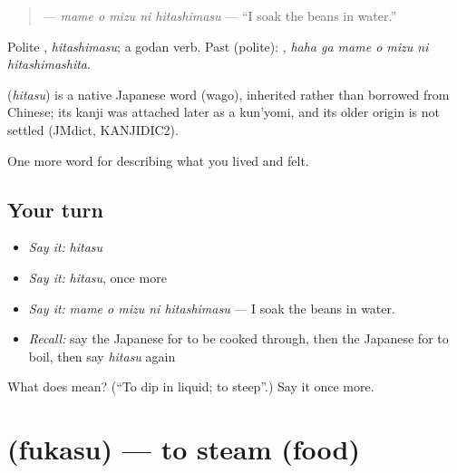 \begin{quote}
\textbf{  } — \emph{mame o mizu ni hitashimasu} — \textquotedblleft{}I soak the beans in water.\textquotedblright{}
\end{quote}

Polite \textbf{}, \emph{hitashimasu}; a godan verb. Past (polite): \textbf{   }, \emph{haha ga mame o mizu ni hitashimashita}.

\begin{cousinweb}
\textbf{} (\emph{hitasu}) is a native Japanese word (wago), inherited rather than borrowed from Chinese; its kanji was attached later as a kun'yomi, and its older origin is not settled (JMdict, KANJIDIC2).
\end{cousinweb}

\begin{grammarlens}[title={What you've built}]
One more word for describing what you lived and felt.
\end{grammarlens}

\subsection*{Your turn}
\begin{itemize}
\raggedright
  \item \emph{Say it:} \emph{hitasu}
  \item \emph{Say it:} \emph{hitasu}, once more
  \item \emph{Say it:} \emph{mame o mizu ni hitashimasu} — I soak the beans in water.
  \item \emph{Recall:} say the Japanese for to be cooked through, then the Japanese for to boil, then say \emph{hitasu} again
\end{itemize}

\begin{tcolorbox}[breakable,colback=teal!4,colframe=teal!35!black,title={Before you move on}]
What does  mean? (\textquotedblleft{}To dip in liquid; to steep\textquotedblright{}.) Say it once more.
\end{tcolorbox}
\section[\texorpdfstring{\ja{ふかす} (fukasu)}{ふかす (fukasu)}]{ (fukasu) — to steam (food)}

\label{lesson:JA-C492-fukasu}



